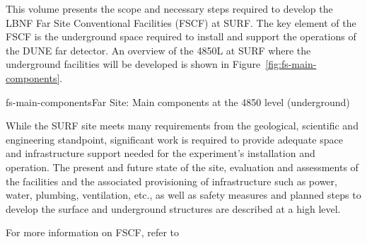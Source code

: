 
This volume presents the scope and necessary steps required to develop the LBNF Far Site Conventional Facilities (FSCF) at SURF. The key element of the FSCF is the underground space required to install and support the operations of the DUNE far detector. An overview of the 4850L at SURF where the underground facilities will be developed is shown in Figure~\ref{fig:fs-main-components}.

\begin{cdrfigure}{fs-main-components}{Far Site: Main components at the 4850 level (underground)}
\end{cdrfigure}

While the SURF site meets many requirements from the geological, scientific and engineering standpoint, significant work is required to provide adequate space and infrastructure support needed for the experiment's installation and operation. The present and future state of the site, evaluation and assessments of the facilities and the associated provisioning of infrastructure such as power, water, plumbing, ventilation, etc., as well as safety measures and planned steps to develop the surface and underground structures are described at a high level.  

For more information on FSCF, refer to 

